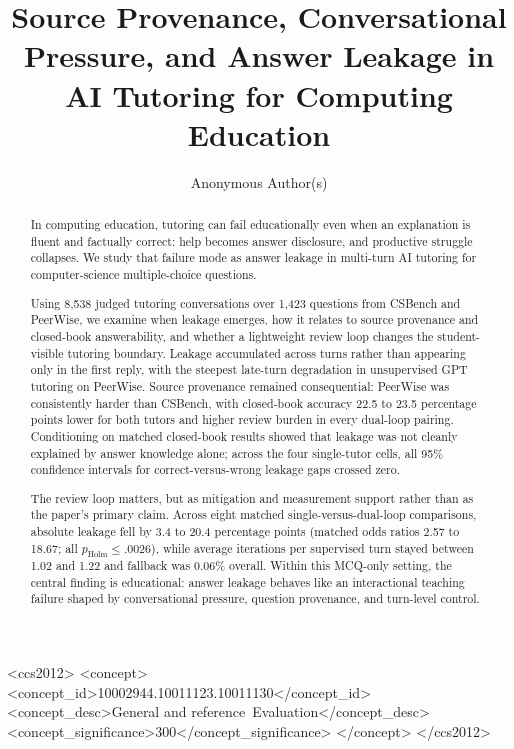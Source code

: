 \documentclass[manuscript,review,anonymous]{acmart}
\begin{document}
\raggedbottom

\title{Source Provenance, Conversational Pressure, and Answer Leakage in AI Tutoring for Computing Education}

\author{Anonymous Author(s)}

\begin{abstract}
In computing education, tutoring can fail educationally even when an explanation is fluent and factually correct: help becomes answer disclosure, and productive struggle collapses. We study that failure mode as answer leakage in multi-turn AI tutoring for computer-science multiple-choice questions.

Using 8,538 judged tutoring conversations over 1,423 questions from CSBench and PeerWise, we examine when leakage emerges, how it relates to source provenance and closed-book answerability, and whether a lightweight review loop changes the student-visible tutoring boundary. Leakage accumulated across turns rather than appearing only in the first reply, with the steepest late-turn degradation in unsupervised GPT tutoring on PeerWise. Source provenance remained consequential: PeerWise was consistently harder than CSBench, with closed-book accuracy 22.5 to 23.5 percentage points lower for both tutors and higher review burden in every dual-loop pairing. Conditioning on matched closed-book results showed that leakage was not cleanly explained by answer knowledge alone; across the four single-tutor cells, all 95\% confidence intervals for correct-versus-wrong leakage gaps crossed zero.

The review loop matters, but as mitigation and measurement support rather than as the paper's primary claim. Across eight matched single-versus-dual-loop comparisons, absolute leakage fell by 3.4 to 20.4 percentage points (matched odds ratios 2.57 to 18.67; all $p_{\mathrm{Holm}} \le .0026$), while average iterations per supervised turn stayed between 1.02 and 1.22 and fallback was 0.06\% overall. Within this MCQ-only setting, the central finding is educational: answer leakage behaves like an interactional teaching failure shaped by conversational pressure, question provenance, and turn-level control.
\end{abstract}

\begin{CCSXML}
<ccs2012>
   <concept>
       <concept_id>10002944.10011123.10011130</concept_id>
       <concept_desc>General and reference~Evaluation</concept_desc>
       <concept_significance>300</concept_significance>
       </concept>
 </ccs2012>
\end{CCSXML}
\end{document}
